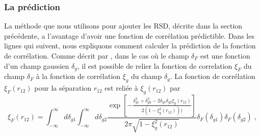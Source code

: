 \documentclass[11pt, twoside, a4paper, openright]{report}
\begin{document}
\subsubsection{La prédiction}
\label{subsubsec:pred}

La méthode que nous utilisons pour ajouter les RSD, décrite dans la section précédente, a l'avantage d'avoir une fonction de corrélation prédictible.%
Dans les lignes qui suivent, nous expliquons comment calculer la prédiction de la fonction de corrélation. Comme décrit par \textcite{Font-Ribera2012}, dans le cas où le champ $\delta_F$ est une fonction d'un champ gaussien $\delta_g$, il est possible de relier la fonction de correlation $\xi_F$ du champ $\delta_F$ à la fonction de corrélation $\xi_g$ du champ $\delta_g$. La fonction de corrélation $\xi_F(r_{12})$ pour la séparation $r_{12}$ est reliée à $\xi_g(r_{12})$ par
\begin{equation}
  \label{eq:xig2xif}
  \xi_F(r_{12}) = \int_{- \infty}^{\infty} d\delta_{g1} \int_{- \infty}^{\infty} d\delta_{g2}
  \frac{
    \exp\left[-
      \frac{
        \delta_{g1}^2 + \delta_{g2}^2 - 2 \delta_{g1} \delta_{g2} \xi_g(r_{12})
      }{
        2 ( 1 - \xi_g^2(r_{12})))
      }\right]
  }{
    2 \pi \sqrt{1 - \xi_g^2(r_{12})}
  }
  \delta_F(\delta_{g1})\delta_F(\delta_{g2})
  \; ,
\end{equation}
\end{document}
